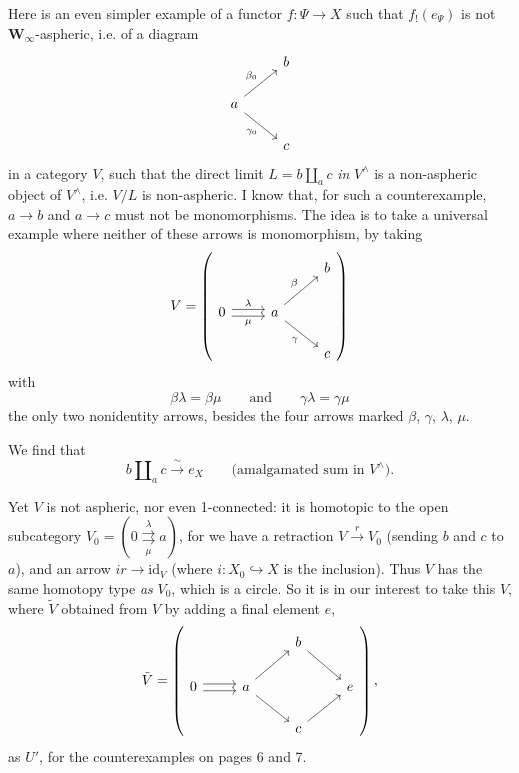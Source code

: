 \documentclass[11pt]{article}
\newcommand{\printedpage}[1]{\marginpar{\footnotesize p.~#1}}
\newcommand{\msp}[1]{\marginpar{\footnotesize [#1]}}
\newcommand{\id}{\mathrm{id}}
\newcommand{\Winf}{\mathbf{W}_{\infty}}
\begin{document}
Here is an even simpler example of a functor $f : \Psi \longrightarrow X$ such that $f_!(e_{\Psi})$ is not $\Winf$-aspheric, i.e. of a diagram
\[
\begin{tikzcd}
& b \\
a \arrow[ur, "\beta_0"] \arrow[dr, "\gamma_0"'] & \\
& c
\end{tikzcd}
\]
\printedpage{6}
\msp{page 8}
in a category $V$, such that the direct limit $L = b \amalg_a c$ \textit{in} $V^{\wedge}$ is a non-aspheric object of $V^{\wedge}$, i.e. $V/L$ is non-aspheric. I know that, for such a counterexample, $a \longrightarrow b$ and $a \longrightarrow c$ must not be monomorphisms. The idea is to take a universal example where neither of these arrows is monomorphism, by taking
\msp{page 9}
\[
V = \left(
\begin{tikzcd}
& & b \\
0 \arrow[r, shift left, "\lambda"] \arrow[r, shift right, "\mu"'] & a \arrow[ur, "\beta"] \arrow[dr, "\gamma"'] & \\
& & c
\end{tikzcd}
\right)
\]
with
\[ \beta\lambda = \beta\mu \qquad \text{and} \qquad \gamma\lambda = \gamma\mu \]
the only two nonidentity arrows, besides the four arrows marked $\beta$, $\gamma$, $\lambda$, $\mu$.

We find that
\[ b \amalg_a c \xrightarrow{\ \sim\ } e_X \qquad \text{(amalgamated sum in } V^{\wedge}\text{).} \] %

Yet $V$ is not aspheric, nor even 1-connected: it is homotopic to the open subcategory $V_0 = (0 \overset{\lambda}{\underset{\mu}{\rightrightarrows}} a)$, for we have a retraction $V \xrightarrow{\ r\ } V_0$ (sending $b$ and $c$ to $a$), and an arrow $ir \longrightarrow \id_V$ (where $i : X_0 \hookrightarrow X$ is the inclusion). Thus $V$ has the same homotopy type \textit{as} $V_0$, which is a circle. So it is in our interest to take this $V$, where $\tilde{V}$ obtained from $V$ by adding a final element $e$, %
\[
\tilde{V} = \left(
\begin{tikzcd}
& & b \arrow[dr] & \\
0 \arrow[r, shift left] \arrow[r, shift right] & a \arrow[ur] \arrow[dr] & & e \\
& & c \arrow[ur] &
\end{tikzcd}
\right),
\]
as $U'$, for the counterexamples on pages 6 and 7.
\end{document}
